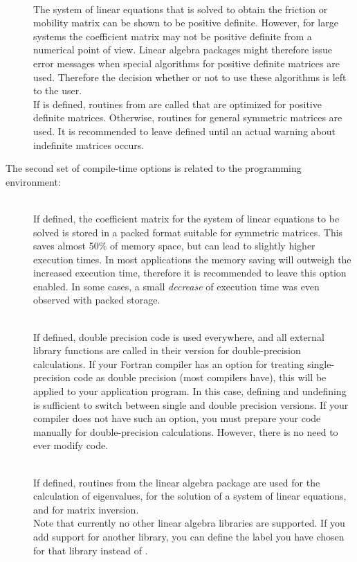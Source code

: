 \begin{description}
\item[]
\\
The system of linear equations that is solved to obtain the friction
or mobility matrix can be shown to be positive definite. However, for
large systems the coefficient matrix may not be positive definite from
a numerical point of view. Linear algebra packages might therefore
issue error messages when special algorithms for positive definite
matrices are used.  Therefore the decision whether or not to use these
algorithms is left to the user.\\ If  is defined,
routines from  are called that are optimized for positive
definite matrices. Otherwise, routines for general symmetric matrices
are used.  It is recommended to leave  defined until an
actual warning about indefinite matrices occurs.\\

\end{description}

The second set of compile-time options is related to the programming
environment:

\begin{description}

\item[]
\\
If defined, the coefficient matrix for the system of linear equations
to be solved is stored in a packed format suitable for symmetric
matrices. This saves almost 50\% of memory space, but can lead to
slightly higher execution times. In most applications the memory
saving will outweigh the increased execution time, therefore it is
recommended to leave this option enabled. In some cases, a
small {\em decrease} of execution time was even observed with packed
storage.

\item[]
\\
If defined, double precision code is used everywhere, and all external
library functions are called in their version for double-precision
calculations. If your Fortran compiler has an option for treating
single-precision code as double precision (most compilers have), this
will be applied to your application program.  In this case, defining
and undefining  is sufficient to switch between single and
double precision versions. If your compiler does not have such an
option, you must prepare your code manually for double-precision
calculations. However, there is no need to ever modify 
code.

\item[]
\\
If defined, routines from the linear algebra package  are
used for the calculation of eigenvalues, for the solution of a system
of linear equations, and for matrix inversion.\\
Note that currently no other linear algebra libraries are
supported. If you add support for another library, you can
define the label you have chosen for that library instead
of .

\end{description}


